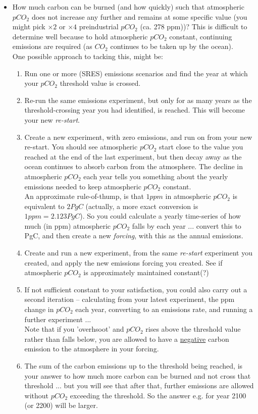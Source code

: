 \begin{itemize}[noitemsep]
\vspace{1mm}
\item How much carbon can  be burned (and how quickly) such that atmospheric \(pCO_{2}\) does not increase any further and remains at some specific value (you might pick \(\times2\) or \(\times4\) preindustrial \(pCO_{2}\) (ca. 278 ppm))? This is difficult to determine well because to hold atmospheric \(pCO_{2}\)  constant, continuing emissions are required (as \(CO_{2}\) continues to be taken up by the ocean).
\vspace{1mm} 
\\One possible approach to tacking this, might be:
\vspace{1mm} 
\begin{enumerate}[noitemsep]
\item Run one or more (SRES) emissions scenarios and find the year at which your \(pCO_{2}\) threshold value is crossed. 
\item Re-run the same emissions experiment, but only for as many years as the threshold-crossing year you had identified, is reached. This will become your new \textit{re-start}.
\item Create a new experiment, with zero emissions, and run on from your new re-start. You should see atmospheric \(pCO_{2}\) start close to the value you reached at the end of the last experiment, but then decay away as the ocean continues to absorb carbon from the atmosphere. The decline in atmospheric \(pCO_{2}\) each year tells you something about the yearly emissions needed to keep atmospheric \(pCO_{2}\) constant.
\\An approximate rule-of-thump, is that \(1ppm\) in atmospheric \(pCO_{2}\) is equivalent to \(2 PgC\) (actually, a more exact conversion is \(1 ppm = 2.123 PgC\)). So you could calculate a yearly time-series of how much (in ppm) atmospheric \(pCO_{2}\) falls by each year ... convert this to PgC, and then create a new \textit{forcing}, with this as the annual emissions.
\item Create and run a new experiment, from the same \textit{re-start} experiment you created, and apply the new emissions forcing you created. See if atmospheric \(pCO_{2}\) is approximately maintained constant(?)  
\item If not sufficient constant to your satisfaction, you could also carry out a second iteration -- calculating from your latest experiment, the ppm change in \(pCO_{2}\) each year, converting to an emissions rate, and running a further experiment ...
\\Note that if you 'overhsoot' and \(pCO_{2}\) rises above the threshold value rather than falls below, you are allowed to have a \uline{negative} carbon emission to the atmosphere in your forcing.
\item The sum of the carbon emissions up to the threshold being reached, is your answer to how much more carbon can be burned and not cross that threshold ... but you will see that after that, further emissions are allowed without \(pCO_{2}\) exceeding the threshold. So the answer e.g. for year 2100 (or 2200) will be larger.
\end{enumerate}


\end{itemize}
